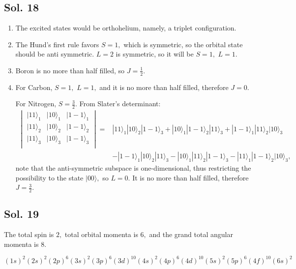    \subsection*{Sol. 18}
   \begin{enumerate}
       \item The excited states would be orthohelium, namely, a triplet configuration.
       \item 
       The Hund's first rule favors $S=1,$ which is symmetric, so the orbital state should be anti symmetric. $L=2$ is symmetric, so it will be $S=1,$ $L=1.$
       \item 
       Boron is no more than half filled, so $J=\frac{1}{2}.$
       \item 
       For Carbon, $S=1,$ $L=1,$ and it is no more than half filled, therefore $J=0.$

       For Nitrogen, $S=\frac{3}{2}.$
        From Slater's determinant: 
        \begin{align*}
            \begin{vmatrix}
                |11\rangle_1 & |10\rangle_1 & |1-1\rangle_1\\
                |11\rangle_2 & |10\rangle_2 & |1-1\rangle_2\\
                |11\rangle_3 & |10\rangle_3 & |1-1\rangle_3\\
            \end{vmatrix}
            =&|11\rangle_1|10\rangle_2|1-1\rangle_3
            +
            |10\rangle_1|1-1\rangle_2|11\rangle_3
            +|1-1\rangle_1|11\rangle_2|10\rangle_3\\
            &-|1-1\rangle_1|10\rangle_2|11\rangle_3
            -|10\rangle_1|11\rangle_2|1-1\rangle_3
            -|11\rangle_1|1-1\rangle_2|10\rangle_3,
        \end{align*}
        note that the anti-symmetric subspace is one-dimensional, thus
        restricting the possibility to the state $|00\rangle,$ so
       $L=0.$ It is no more than half filled, therefore $J=\frac{3}{2}.$

        
       
   \end{enumerate}
   \subsection*{Sol. 19}
   The total spin is $2,$ total orbital momenta is $6,$ and the grand total angular momenta is $8.$

   $$
   (1s)^2(2s)^2(2p)^6(3s)^2(3p)^6(3d)^{10}(4s)^2(4p)^6
   (4d)^{10}(5s)^2(5p)^6(4f)^{10}(6s)^2
   $$
